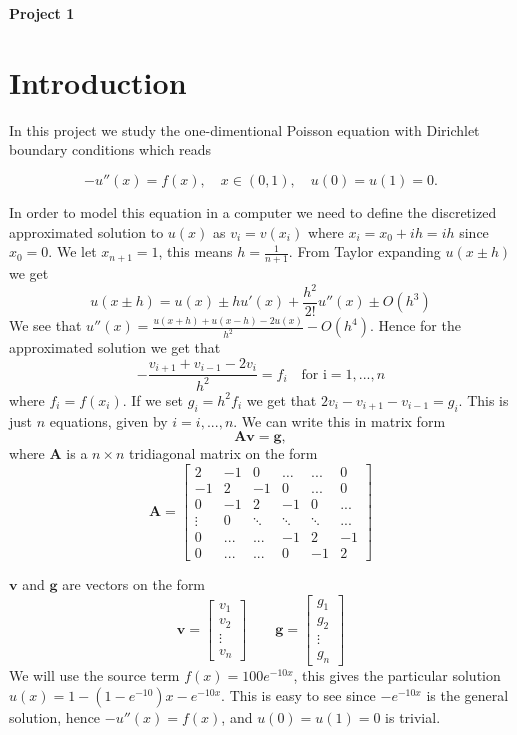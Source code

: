 \documentclass[10pt]{article}
\begin{document}
\begin{center}
  \huge \textbf{Project 1}
\end{center}
\section{Introduction}
In this project we study the one-dimentional Poisson equation 
with Dirichlet boundary conditions which reads 

\begin{equation*}
 -u''(x)=f(x),\quad x\in (0,1),\quad u(0)=u(1)=0.
\end{equation*}

In order to model this equation in a computer we need to define the 
discretized approximated solution to $ u(x) $ as $v_i=v(x_i) $ where
 $x_i=x_0+ih=ih$ since $x_0=0$. We let $x_{n+1}=1$, this means $h=\frac{1}{n+1}$.
 From Taylor expanding $u(x\pm h)$ we get 
 $$u(x\pm h)=u(x)\pm hu'(x)+\frac{h^2}{2!}u''(x)\pm O(h^3)$$
We see that $u''(x)=\frac{u(x+h)+u(x-h)-2u(x)}{h^2}-O(h^4)$. Hence for the approximated solution
 we get that $$-\frac{v_{i+1}+v_{i-1}-2v_i}{h^2}=f_i\quad \text{for i}=1,...,n$$ where $f_i=f(x_i)$. 
 If we set $g_i=h^2f_i$ we get that $2v_i-v_{i+1}-v_{i-1}=g_i$. 
 This is just $n$ equations, given by $i=i,...,n$. We can write this in matrix form 
 $$\mathbf{A}\mathbf{v}=\mathbf{g}, $$ where $\mathbf{A}$ is a $n\times n$ 
 tridiagonal matrix on the form $$\mathbf{A}=\begin{bmatrix}
   2 & -1 & 0 & \dots & ... & 0 \\
   -1 & 2 & -1 & 0 & ... & 0 \\
   0  & -1 & 2 & -1 & 0 & ... \\
   \vdots & 0 & \ddots & \ddots & \ddots & ...\\
   0 & ... & ... & -1 & 2 & -1\\
   0 & ... & ... & 0 & -1 & 2 
 \end{bmatrix}$$

 $\mathbf{v}$ and $\mathbf{g}$ are vectors on the form 
 $$\mathbf{v}=\begin{bmatrix}
   v_1\\v_2\\\vdots\\v_n
 \end{bmatrix}
 \qquad
 \mathbf{g}=\begin{bmatrix}
   g_1\\g_2\\\vdots\\g_n
 \end{bmatrix}
 $$
We will use the source term $f(x)=100e^{-10x}$, this gives the particular solution 
$u(x)=1-(1-e^{-10})x-e^{-10x}$. This is easy to see since $-e^{-10x}$ is the general solution,
 hence $-u''(x)=f(x)$, and $u(0)=u(1)=0$ is trivial. 
\end{document}
